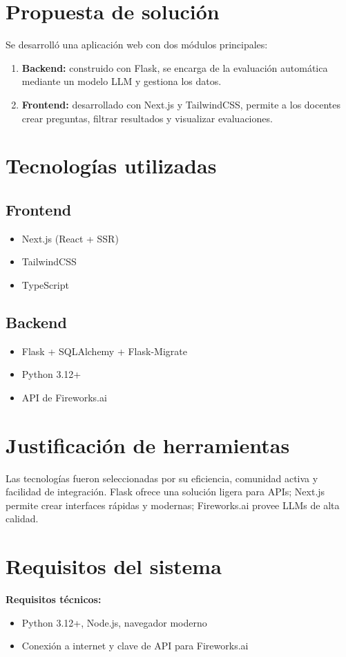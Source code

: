 \documentclass[12pt]{article}
\begin{document}
\section{Propuesta de solución}
Se desarrolló una aplicación web con dos módulos principales:
\begin{enumerate}
  \item \textbf{Backend:} construido con Flask, se encarga de la evaluación automática mediante un modelo LLM y gestiona los datos.
  \item \textbf{Frontend:} desarrollado con Next.js y TailwindCSS, permite a los docentes crear preguntas, filtrar resultados y visualizar evaluaciones.
\end{enumerate}

\section{Tecnologías utilizadas}
\subsection*{Frontend}
\begin{itemize}
  \item Next.js (React + SSR)
  \item TailwindCSS
  \item TypeScript
\end{itemize}

\subsection*{Backend}
\begin{itemize}
  \item Flask + SQLAlchemy + Flask-Migrate
  \item Python 3.12+
  \item API de Fireworks.ai
\end{itemize}

\section{Justificación de herramientas}
Las tecnologías fueron seleccionadas por su eficiencia, comunidad activa y facilidad de integración. Flask ofrece una solución ligera para APIs; Next.js permite crear interfaces rápidas y modernas; Fireworks.ai provee LLMs de alta calidad.

\section{Requisitos del sistema}
\textbf{Requisitos técnicos:}
\begin{itemize}
  \item Python 3.12+, Node.js, navegador moderno
  \item Conexión a internet y clave de API para Fireworks.ai
\end{itemize}
\end{document}
